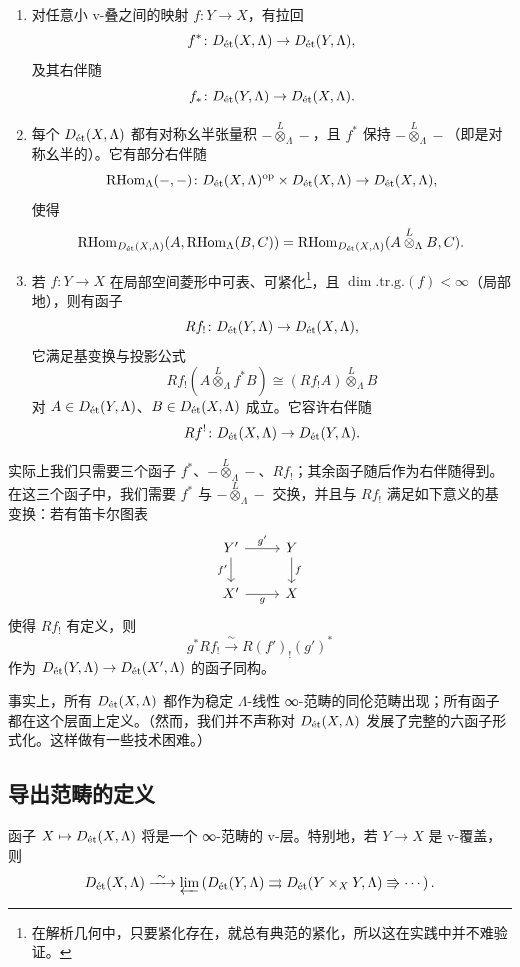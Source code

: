 \begin{enumerate}[label=(\arabic*)]
\item 对任意小 v-叠之间的映射 $f\colon Y\to X$，有拉回
\[
f^*\colon D_{\et}(X,\Lambda)\to D_{\et}(Y,\Lambda),
\]
及其右伴随
\[
f_*\colon D_{\et}(Y,\Lambda)\to D_{\et}(X,\Lambda).
\]
\item 每个 $D_{\et}(X,\Lambda)$ 都有对称幺半张量积 $-\overset{L}{\otimes}_{\Lambda}-$，且 $f^*$ 保持 $-\overset{L}{\otimes}_{\Lambda}-$（即是对称幺半的）。它有部分右伴随
\[
\mathrm{RHom}_{\Lambda}(-,-)\colon D_{\et}(X,\Lambda)^{\mathrm{op}}\times D_{\et}(X,\Lambda)\to D_{\et}(X,\Lambda),
\]
使得
\[
\mathrm{RHom}_{D_{\et}(X,\Lambda)}(A,\mathrm{RHom}_{\Lambda}(B,C))=\mathrm{RHom}_{D_{\et}(X,\Lambda)}(A\overset{L}{\otimes}_{\Lambda}B,C).
\]
\item 若 $f\colon Y\to X$ 在局部空间菱形中可表、可紧化\footnote{在解析几何中，只要紧化存在，就总有典范的紧化，所以这在实践中并不难验证。}，且 $\dim.\mathrm{tr.g.}(f)<\infty$（局部地），则有函子
\[
Rf_!\colon D_{\et}(Y,\Lambda)\to D_{\et}(X,\Lambda),
\]
它满足基变换与投影公式
\[
Rf_!(A\overset{L}{\otimes}_{\Lambda}f^*B)\cong(Rf_!A)\overset{L}{\otimes}_{\Lambda}B
\]
对 $A\in D_{\et}(Y,\Lambda)$、$B\in D_{\et}(X,\Lambda)$ 成立。它容许右伴随
\[
Rf^{!}\colon D_{\et}(X,\Lambda)\to D_{\et}(Y,\Lambda).
\]
\end{enumerate}


实际上我们只需要三个函子 $f^*$、$-\overset{L}{\otimes}_{\Lambda}-$、$Rf_!$；其余函子随后作为右伴随得到。在这三个函子中，我们需要 $f^*$ 与 $-\overset{L}{\otimes}_{\Lambda}-$ 交换，并且与 $Rf_!$ 满足如下意义的基变换：若有笛卡尔图表
\[
\begin{tikzcd}
Y' \arrow[r, "g'"] \arrow[d, "f'"'] & Y \arrow[d, "f"] \\
X' \arrow[r, "g"'] & X
\end{tikzcd}
\]
使得 $Rf_!$ 有定义，则
\[
g^*Rf_!\xrightarrow{\ \sim\ }R(f')_!(g')^*
\]
作为 $D_{\et}(Y,\Lambda)\to D_{\et}(X',\Lambda)$ 的函子同构。

事实上，所有 $D_{\et}(X,\Lambda)$ 都作为稳定 $\Lambda$-线性 ∞-范畴的同伦范畴出现；所有函子都在这个层面上定义。（然而，我们并不声称对 $D_{\et}(X,\Lambda)$ 发展了完整的六函子形式化。这样做有一些技术困难。）

\subsection{导出范畴的定义}

函子 $X\mapsto D_{\et}(X,\Lambda)$ 将是一个 ∞-范畴的 v-层。特别地，若 $Y\to X$ 是 v-覆盖，则
\[
D_{\et}(X,\Lambda)\xrightarrow{\ \sim\ }\varprojlim\left(D_{\et}(Y,\Lambda)\rightrightarrows D_{\et}(Y\times_X Y,\Lambda)\Rrightarrow\cdots\right).
\]

